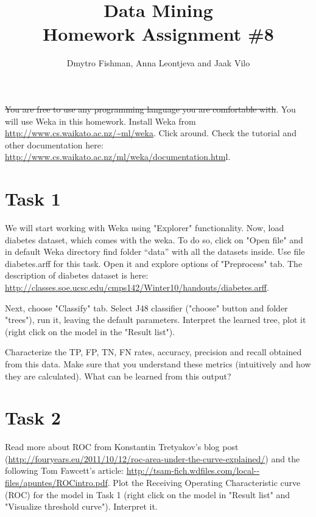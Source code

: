 \documentclass{article}
\title{Data Mining\\Homework Assignment \#8} %
\author{Dmytro Fishman, Anna Leontjeva and Jaak Vilo} %
\begin{document}
\maketitle %

\st{You are free to use any programming language you are comfortable with}. You will use Weka in this homework. Install Weka from \url{http://www.cs.waikato.ac.nz/~ml/weka}. Click around. Check the tutorial and other documentation here: \url{http://www.cs.waikato.ac.nz/ml/weka/documentation.htm}l.

\section*{Task 1}
We will start working with Weka using "Explorer" functionality. Now, load diabetes dataset, which comes with the weka. To do so, click on "Open file" and in default Weka directory find folder ``data'' with all the datasets inside. Use file diabetes.arff for this task. Open it and explore options of "Preprocess" tab. The description of diabetes dataset is here: \url{http://classes.soe.ucsc.edu/cmps142/Winter10/handouts/diabetes.arff}.
 
Next, choose "Classify" tab. Select J48 classifier ("choose" button and folder "trees"), run it, leaving the default parameters. Interpret the learned tree, plot it (right click on the model in the "Result list"). 

Characterize the TP, FP, TN, FN rates, accuracy, precision and recall obtained from this data. Make sure that you understand these metrics (intuitively and how they are calculated). What can be learned from this output?

\section*{Task 2}
Read more about ROC from Konstantin Tretyakov's blog post (\url{http://fouryears.eu/2011/10/12/roc-area-under-the-curve-explained/}) and the following Tom Fawcett's article: \url{http://tsam-fich.wdfiles.com/local--files/apuntes/ROCintro.pdf}. Plot the Receiving Operating Characteristic curve (ROC) for the model in Task 1 (right click on the model in "Result list" and "Visualize threshold curve"). Interpret it. 
\end{document}

